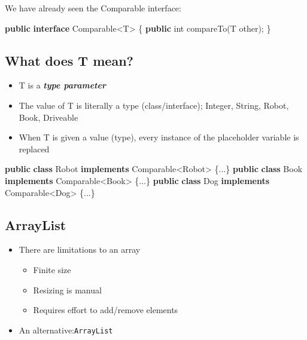 \documentclass[]{article}
\newenvironment{Shaded}{}{}
\newcommand{\BuiltInTok}[1]{#1}
\newcommand{\DataTypeTok}[1]{\textcolor[rgb]{0.56,0.13,0.00}{#1}}
\newcommand{\FunctionTok}[1]{\textcolor[rgb]{0.02,0.16,0.49}{#1}}
\newcommand{\KeywordTok}[1]{\textcolor[rgb]{0.00,0.44,0.13}{\textbf{#1}}}
\newcommand{\NormalTok}[1]{#1}
\providecommand{\tightlist}{%
  \setlength{\itemsep}{0pt}\setlength{\parskip}{0pt}}
\begin{document}
We have already seen the Comparable interface:

\begin{Shaded}
\begin{Highlighting}[]
\KeywordTok{public} \KeywordTok{interface} \BuiltInTok{Comparable}\NormalTok{<T> \{}
    \KeywordTok{public} \DataTypeTok{int} \FunctionTok{compareTo}\NormalTok{(T other);}
\NormalTok{\}}
\end{Highlighting}
\end{Shaded}

\hypertarget{what-does-t-mean}{%
\subsection{What does T mean?}\label{what-does-t-mean}}

\begin{itemize}
\item
  T is a \textbf{\emph{type parameter}}
\item
  The value of T is literally a type (class/interface); Integer, String,
  Robot, Book, Driveable
\item
  When T is given a value (type), every instance of the placeholder
  variable is replaced
\end{itemize}

\begin{Shaded}
\begin{Highlighting}[]
\KeywordTok{public} \KeywordTok{class} \BuiltInTok{Robot} \KeywordTok{implements} \BuiltInTok{Comparable}\NormalTok{<}\BuiltInTok{Robot}\NormalTok{> \{...\}}
\KeywordTok{public} \KeywordTok{class} \BuiltInTok{Book} \KeywordTok{implements} \BuiltInTok{Comparable}\NormalTok{<}\BuiltInTok{Book}\NormalTok{> \{...\}}
\KeywordTok{public} \KeywordTok{class}\NormalTok{ Dog }\KeywordTok{implements} \BuiltInTok{Comparable}\NormalTok{<Dog> \{...\}}
\end{Highlighting}
\end{Shaded}

\hypertarget{arraylist}{%
\subsection{ArrayList}\label{arraylist}}

\begin{itemize}
\tightlist
\item
  There are limitations to an array

  \begin{itemize}
  \tightlist
  \item
    Finite size
  \item
    Resizing is manual
  \item
    Requires effort to add/remove elements
  \end{itemize}
\item
  An alternative:\texttt{ArrayList}
\end{itemize}
\end{document}
